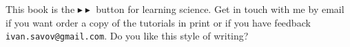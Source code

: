 \documentclass[letterpaper,9pt,journal]{IEEEtran}
\begin{document}
This book is the $\blacktriangleright\!\blacktriangleright$ button for learning science.
Get in touch with me by email if you want order a copy of the tutorials in print
or if you have feedback \texttt{ivan.savov@gmail.com}.
Do you like this style of writing?


%
\end{document}
